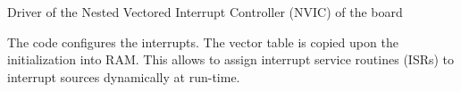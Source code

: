 Driver of the Nested Vectored Interrupt Controller (NVIC) of the board

The code configures the interrupts. The vector table is copied upon the initialization into RAM. This allows to assign interrupt service routines (ISRs) to interrupt sources dynamically at run-\/time. 